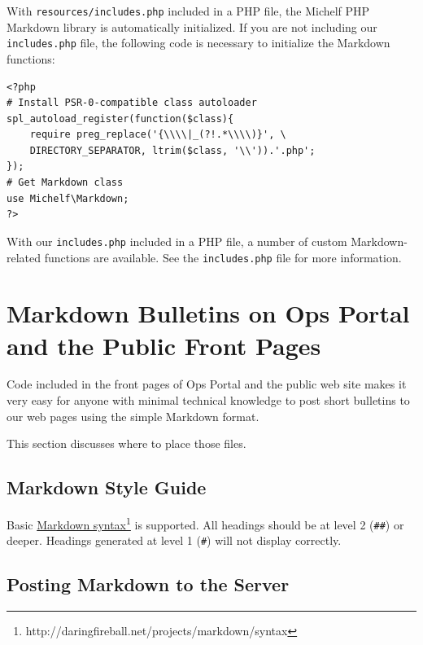 \documentclass[pdflatex,letterpaper,twoside,12pt]{book}
\begin{document}
With \texttt{resources/includes.php} included in a PHP file, the Michelf PHP Markdown library is automatically initialized.  If you are not including our \texttt{includes.php} file, the following code is necessary to initialize the Markdown functions:

\begin{verbatim}
<?php
# Install PSR-0-compatible class autoloader
spl_autoload_register(function($class){
	require preg_replace('{\\\\|_(?!.*\\\\)}', \
	DIRECTORY_SEPARATOR, ltrim($class, '\\')).'.php';
});
# Get Markdown class
use Michelf\Markdown;
?>
\end{verbatim}

With our \texttt{includes.php} included in a PHP file, a number of custom Markdown-related functions are available.  See the \texttt{includes.php} file for more information.


\section{Markdown Bulletins on Ops Portal and the Public Front Pages}\label{markdown-bulletins}

Code included in the front pages of Ops Portal and the public web site makes it very easy for anyone with minimal technical knowledge to post short bulletins to our web pages using the simple Markdown format.

This section discusses where to place those files.

\subsection{Markdown Style Guide}

Basic \href{http://daringfireball.net/projects/markdown/syntax}{Markdown syntax}\footnote{http://daringfireball.net/projects/markdown/syntax} is supported.  All headings should be at level 2 (\texttt{\#\#}) or deeper.  Headings generated at level 1 (\texttt{\#}) will not display correctly.

\subsection{Posting Markdown to the Server}
\end{document}
